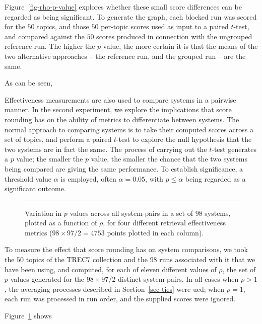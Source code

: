 Figure~\ref{fig-rho-p-value} explores whether these small score
differences can be regarded as being significant.
To generate the graph, each blocked run was scored for the $50$
topics, and those $50$ per-topic scores used as input to a paired
$t$-test, and compared against the $50$ scores produced in connection
with the ungrouped reference run.
The higher the $p$ value, the more certain it is that the means of
the two alternative approaches -- the reference run, and the grouped
run -- are the same.

As can be seen, {}

{}

{}
{}


Effectiveness measurements are also used to compare systems in a
pairwise manner.
In the second experiment, we explore the implications that score
rounding has on the ability of metrics to differentiate between
systems.
The normal approach to comparing systems is to take their computed
scores across a set of topics, and perform a paired $t$-test to
explore the null hypothesis that the two systems are in fact the
same.
The process of carrying out the $t$-test generates a $p$ value; the
smaller the $p$ value, the smaller the chance that the two systems
being compared are giving the same performance.
To establish significance, a threshold value $\alpha$ is employed,
often $\alpha=0.05$, with $p\le\alpha$ being regarded as a
significant outcome.

\begin{figure}[t]
\centering
\rule{0.5mm}{45mm}
\caption{Variation in $p$ values across all system-pairs in a set of
$98$ systems, plotted as a function of $\rho$, for four different
retrieval effectiveness metrics ($98\times97/2=4753$ points plotted
in each column).
\label{fig-pair-variation}}
\end{figure}

To measure the effect that score rounding has on system comparisons,
we took the $50$ topics of the TREC7 collection and the $98$ runs
associated with it that we have been using, and computed, for each of
eleven different values of $\rho$, the set of $p$ values generated
for the $98\times97/2$ distinct system pairs.
In all cases when $\rho>1$, the averaging processes described in
Section~\ref{sec-ties} were ued; when $\rho=1$, each run was
processed in run order, and the supplied scores were ignored.

Figure~\ref{fig-pair-variation} shows {}
